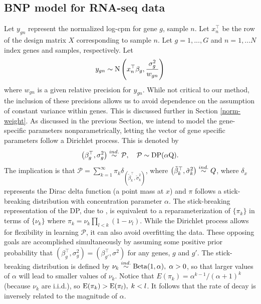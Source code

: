 \subsection{BNP model for RNA-seq data}
\label{sec:model}
Let $y_{gn}$ represent the normalized log-cpm for gene $g$, sample $n$. Let $x_{n}^\top$ be the row of the design matrix $X$ corresponding to sample $n$. Let $g=1,...,G$ and $n=1,...N$ index genes and samples, respectively. Let
\begin{equation}
y_{gn} \sim \operatorname{N} \left( x_{n}^\top \beta_g, \frac{\sigma^2_g}{w_{gn}} \right)
\end{equation}
where $w_{gn}$ is a given relative precision for $y_{gn}$. While not critical to our method, the inclusion of these precisions allows us to avoid dependence on the assumption of constant variance within genes. This is discussed further in Section \ref{norm-weight}. As discussed in the previous Section, we intend to model the gene-specific parameters nonparametrically, letting the vector of gene specific parameters follow a Dirichlet process. This is denoted by
\begin{equation}
\left(\beta_g^\top,\sigma^2_g\right) \stackrel{ind.}{\sim} \mathcal{P},\quad \mathcal{P} \sim \operatorname{DP}(\alpha \mbox{Q}).
\end{equation}
The implication is that $\mathcal{P} =\sum_{k=1}^\infty \pi_k \delta_{\left(\tilde{\beta}_k^\top ,\tilde{\sigma}^2_k\right)}$, where $\left(\tilde{\beta}_k^\top ,\tilde{\sigma}^2_k\right) \stackrel{ind.}{\sim} Q$, where $\delta_{x}$ represents the Dirac delta function (a point mass at $x$) and $\pi$ follows a stick-breaking distribution with concentration parameter $\alpha$. The stick-breaking representation of the DP, due to \citet{sethuraman}, is equivalent to a reparameterization of $\{\pi_k\}$ in terms of $\{\nu_k\}$ where $\pi_k = \nu_k \prod_{l<k}(1-\nu_l)$. While the Dirichlet process allows for flexibility in learning $\mathcal{P}$, it can also avoid overfitting the data. These opposing goals are accomplished simultaneously by assuming some positive prior probability that $(\beta_g^\top,\sigma_g^2)=(\beta_{g'}^\top,\sigma^2)$ for any genes, $g$ and $g'$. The stick-breaking distribution is defined by $\nu_k \stackrel{ind.}{\sim} \operatorname{Beta}(1, \alpha),\; \alpha>0$, so that larger values of $\alpha$ will lead to smaller values of $\nu_k$. Notice that $E(\pi_k)=\alpha^{k-1}/(\alpha+1)^{k}$ (because $\nu_k$ are i.i.d.), so $\operatorname{E}(\pi_k)>\operatorname{E}(\pi_l),\;k<l$. It follows that the rate of decay is inversely related to the magnitude of $\alpha$.

